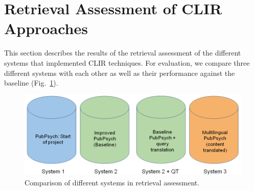\documentclass[a4paper,11pt]{article}
\begin{document}
\section{Retrieval Assessment of CLIR Approaches}
This section describes the results of the retrieval assessment of the different systems that implemented CLIR techniques.
For evaluation, we compare three different systems with each other as well as their performance against the baseline (Fig.~\ref{fig:diffsystems}).

\begin{figure}[h]
\centering
\includegraphics[width=14cm]{./img/systemseval}
\caption{Comparison of different systems in retrieval assessment.}
\label{fig:diffsystems}
\end{figure}
\end{document}
